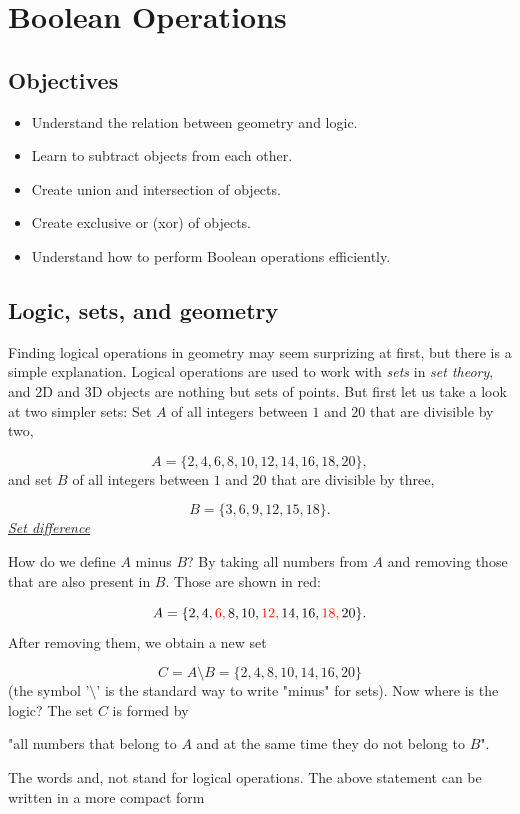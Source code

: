 \documentclass{article}
\begin{document}
\section{Boolean Operations}

\subsection{Objectives}
\begin{itemize}
\item Understand the relation between geometry and logic.
\item Learn to subtract objects from each other.
\item Create union and intersection of objects.
\item Create exclusive or (xor) of objects.
\item Understand how to perform Boolean operations efficiently.
\end{itemize}

\subsection{Logic, sets, and geometry}

Finding logical operations in geometry may seem surprizing at first, but there 
is a simple explanation. Logical operations are used to 
work with {\em sets} in {\em set theory}, and 2D and 3D objects are nothing 
but sets of points. But first let us take a look at two simpler sets: 
Set $A$ of all integers between $1$ and $20$ that are divisible by two,

$$
A = \{2, 4, 6, 8, 10, 12, 14, 16, 18, 20\},
$$
and set $B$ of all integers between $1$ and $20$ that are divisible by three,

$$
B = \{3, 6, 9, 12, 15, 18\}.
$$
\underline{\em Set difference}

How do we define $A$ minus $B$? By taking all numbers from $A$ 
and removing those that are also present in $B$. Those are shown in red: 

$$
A = \{2, 4, {\color{red}6,} \,8, 10, {\color{red}12,} \,14, 16, {\color{red}18,} \,20\}.
$$
After removing them, we obtain a new set

$$
C = A \setminus B = \{2, 4, 8, 10, 14, 16, 20\}
$$
(the symbol '$\setminus$' is the standard way to write "minus" for sets).
Now where is the logic? The set $C$ is formed by \\

\centerline{
"all numbers that belong to $A$ {\color{red}and} at the same time they do {\color{red}not} belong to $B$".
}
\vspace{4mm}
\noindent
The words {\color{red}and}, {\color{red}not} stand for logical operations. 
The above statement can be written in a more compact form \\
\end{document}
